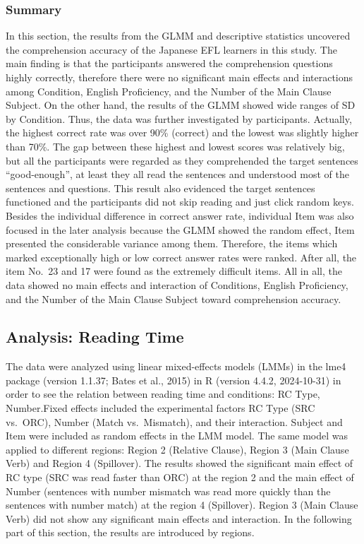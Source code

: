 \documentclass[
]{article}
\begin{document}
\subsubsection{Summary}\label{summary-5}

In this section, the results from the GLMM and descriptive statistics
uncovered the comprehension accuracy of the Japanese EFL learners in
this study. The main finding is that the participants answered the
comprehension questions highly correctly, therefore there were no
significant main effects and interactions among Condition, English
Proficiency, and the Number of the Main Clause Subject. On the other
hand, the results of the GLMM showed wide ranges of SD by Condition.
Thus, the data was further investigated by participants. Actually, the
highest correct rate was over 90\% (correct) and the lowest was slightly
higher than 70\%. The gap between these highest and lowest scores was
relatively big, but all the participants were regarded as they
comprehended the target sentences ``good-enough'', at least they all
read the sentences and understood most of the sentences and questions.
This result also evidenced the target sentences functioned and the
participants did not skip reading and just click random keys. Besides
the individual difference in correct answer rate, individual Item was
also focused in the later analysis because the GLMM showed the random
effect, Item presented the considerable variance among them. Therefore,
the items which marked exceptionally high or low correct answer rates
were ranked. After all, the item No.~23 and 17 were found as the
extremely difficult items. All in all, the data showed no main effects
and interaction of Conditions, English Proficiency, and the Number of
the Main Clause Subject toward comprehension accuracy.

\subsection{Analysis: Reading Time}\label{analysis-reading-time}

The data were analyzed using linear mixed-effects models (LMMs) in the
lme4 package (version 1.1.37; Bates et al., 2015) in R (version 4.4.2,
2024-10-31) in order to see the relation between reading time and
conditions: RC Type, Number.Fixed effects included the experimental
factors RC Type (SRC vs.~ORC), Number (Match vs.~Mismatch), and their
interaction. Subject and Item were included as random effects in the LMM
model. The same model was applied to different regions: Region 2
(Relative Clause), Region 3 (Main Clause Verb) and Region 4 (Spillover).
The results showed the significant main effect of RC type (SRC was read
faster than ORC) at the region 2 and the main effect of Number
(sentences with number mismatch was read more quickly than the sentences
with number match) at the region 4 (Spillover). Region 3 (Main Clause
Verb) did not show any significant main effects and interaction. In the
following part of this section, the results are introduced by regions.
\end{document}
